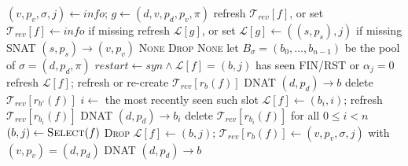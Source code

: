 \documentclass[conference]{IEEEtran}
\begin{document}
\begin{algorithm}[t]
\caption{\textsc{LoadBalance}$(f, \rho, \textit{syn}, \textit{kind}, \textit{info})$, $f=(s,d,p_s,p_d,\pi)$}
\label{alg:lb}
\begin{algorithmic}[1]
  \STATE $(v,p_v,\sigma,j) \gets \textit{info}$;
         $g \gets (d, v, p_d, p_v, \pi)$ 
  \STATE refresh $\mathcal{T}_{rev}[f]$, or set $\mathcal{T}_{rev}[f] \gets \textit{info}$ if missing
  \STATE refresh $\mathcal{L}[g]$, or set $\mathcal{L}[g] \gets ((s,p_s), j)$ if missing
  \RETURN SNAT $(s,p_s) \to (v,p_v)$
\ENDIF
{}
  \RETURN \textsc{None}
\ENDIF
{}
    \RETURN \textsc{Drop} 
  \ENDIF
  \RETURN \textsc{None}
\ENDIF
\STATE let $B_\sigma=(b_0,\dots,b_{n-1})$ be the pool of $\sigma=(d,p_d,\pi)$
\STATE $\textit{restart} \gets \textit{syn} \land \mathcal{L}[f]=(b,j)$ has seen FIN/RST or $\alpha_j=0$
  \STATE refresh $\mathcal{L}[f]$; refresh or re-create $\mathcal{T}_{rev}[r_b(f)]$
  \RETURN DNAT $(d,p_d) \to b$
  \STATE delete $\mathcal{T}_{rev}[r_{b'}(f)]$ 
  \STATE $i \gets$ the most recently seen such slot
  \STATE $\mathcal{L}[f] \gets (b_i,i)$; refresh $\mathcal{T}_{rev}[r_{b_i}(f)]$ 
  \RETURN DNAT $(d,p_d) \to b_i$
\ENDIF
{}
  \STATE delete $\mathcal{T}_{rev}[r_{b_i}(f)]$ for all $0 \le i < n$ 
\ENDIF
\STATE $(b,j) \gets \textsc{Select}(f)$ 
  \RETURN \textsc{Drop} 
\ENDIF
\STATE $\mathcal{L}[f] \gets (b,j)$;
       $\mathcal{T}_{rev}[r_b(f)] \gets (v,p_v,\sigma,j)$ with $(v,p_v)=(d,p_d)$
\RETURN DNAT $(d,p_d) \to b$
\end{algorithmic}
\end{algorithm}
\end{document}
